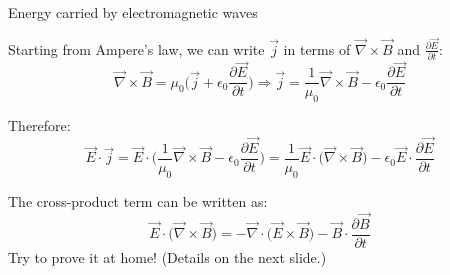 %
%
%
%

\begin{frame}{Energy carried by electromagnetic waves}

Starting from Ampere's law, we can write $\vec{j}$ in terms of
$\vec{\nabla} \times \vec{B}$ and $\frac{\partial \vec{E}}{\partial t}$:
\begin{equation*}
  \vec{\nabla} \times \vec{B} = \mu_0 \Big( \vec{j} + \epsilon_0 \frac{\partial \vec{E}}{\partial t} \Big) \Rightarrow
  \vec{j} = \frac{1}{\mu_0}  \vec{\nabla} \times \vec{B} - \epsilon_0 \frac{\partial \vec{E}}{\partial t}
\end{equation*}

Therefore:
\begin{equation*}
 \vec{E} \cdot \vec{j} =
   \vec{E} \cdot \Big( \frac{1}{\mu_0}  \vec{\nabla} \times \vec{B} - \epsilon_0 \frac{\partial \vec{E}}{\partial t} \Big) =
   \frac{1}{\mu_0}  \vec{E} \cdot \Big( \vec{\nabla} \times \vec{B} \Big) - \epsilon_0 \vec{E} \cdot \frac{\partial \vec{E}}{\partial t}
\end{equation*}

The cross-product term can be written as:
\begin{equation*}
 \vec{E} \cdot \Big( \vec{\nabla} \times \vec{B} \Big) =
 - \vec{\nabla} \cdot \Big( \vec{E} \times \vec{B} \Big) - \vec{B} \cdot \frac{\partial \vec{B}}{\partial t}
\end{equation*}
Try to prove it at home! (Details on the next slide.)

\end{frame}

%
%
%
%


